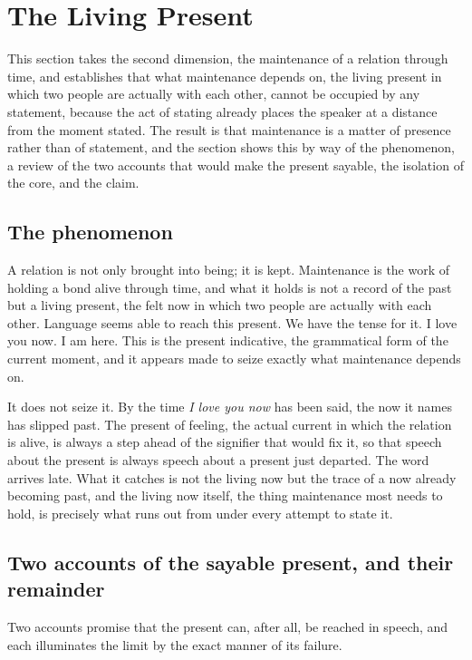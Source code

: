 \section{The Living Present}
\label{p26:sec:maintenance}

\noindent
This section takes the second dimension, the maintenance of a relation through time, and establishes that what maintenance depends on, the living present in which two people are actually with each other, cannot be occupied by any statement, because the act of stating already places the speaker at a distance from the moment stated. The result is that maintenance is a matter of presence rather than of statement, and the section shows this by way of the phenomenon, a review of the two accounts that would make the present sayable, the isolation of the core, and the claim.

\subsection*{The phenomenon}

A relation is not only brought into being; it is kept. Maintenance is the work of holding a bond alive through time, and what it holds is not a record of the past but a living present, the felt now in which two people are actually with each other. Language seems able to reach this present. We have the tense for it. I love you now. I am here. This is the present indicative, the grammatical form of the current moment, and it appears made to seize exactly what maintenance depends on.

It does not seize it. By the time \emph{I love you now} has been said, the now it names has slipped past. The present of feeling, the actual current in which the relation is alive, is always a step ahead of the signifier that would fix it, so that speech about the present is always speech about a present just departed. The word arrives late. What it catches is not the living now but the trace of a now already becoming past, and the living now itself, the thing maintenance most needs to hold, is precisely what runs out from under every attempt to state it.

\subsection*{Two accounts of the sayable present, and their remainder}

Two accounts promise that the present can, after all, be reached in speech, and each illuminates the limit by the exact manner of its failure.

